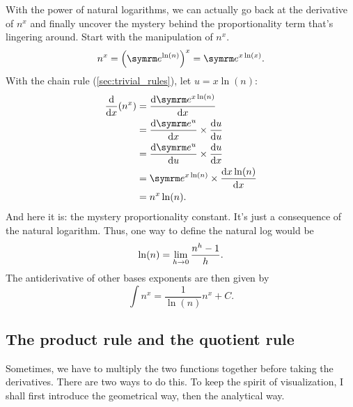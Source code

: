 With the power of natural logarithms, we can actually go back at the derivative of $n^x$ and finally uncover the mystery behind the proportionality term that's lingering around. Start with the manipulation of $n^x$.
\begin{equation}
    n^x = \left(\e^{\ln(n)}\right)^x = \e^{x\ln(x)}.
\end{equation}
With the chain rule (\cref{sec:trivial_rules}), let $u = x\ln(n)$:
\begin{align*}
    \odv*{(n^x)}{x} &= \odv{\e^{x\ln(n)}}{x} \\
    &= \odv{\e^u}{x} \times \odv{u}{u} \\
    &= \odv{\e^u}{u} \times \odv{u}{x} \\
    &= \e^{x\ln(n)} \times \odv{x\ln(n)}{x} \\
    &= n^x\ln(n).
\end{align*}
And here it is: the mystery proportionality constant. It's just a consequence of the natural logarithm. Thus, one way to define the natural log would be
\begin{equation}
    \ln(n) = \lim_{h \rightarrow 0}\frac{n^h - 1}{h}.
\end{equation}
The antiderivative of other bases exponents are then given by
\begin{equation}
    \int n^x = \frac{1}{\ln(n)}n^x + C.
\end{equation}

\subsection{The product rule and the quotient rule}

Sometimes, we have to multiply the two functions together before taking the derivatives. There are two ways to do this. To keep the spirit of visualization, I shall first introduce the geometrical way, then the analytical way.

